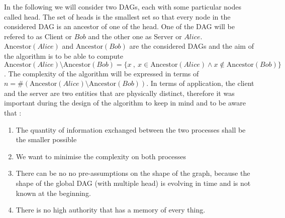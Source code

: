 In the following we will consider two DAGs, each with some particular nodes called head. The set of heads is the smallest set so that every node in the considered DAG is an ancestor of one of the head. One of the DAG will be refered to as Client or $Bob$ and the other one as Server or $Alice$. $\mathrm{Ancestor}(Alice)$ and $\mathrm{Ancestor}(Bob)$ are the considered DAGs and the aim of the algorithm is to be able to compute $\mathrm{Ancestor}(Alice) \setminus \mathrm{Ancestor}(Bob) = \{ x\ ,\ x \in \mathrm{Ancestor}(Alice) \wedge x \notin \mathrm{Ancestor}(Bob)\}$. The complexity of the algorithm will be expressed in terms of $n = \#(\mathrm{Ancestor}(Alice) \setminus \mathrm{Ancestor}(Bob))$. In terms of application, the client and the server are two entities that are physically distinct, therefore it was important during the design of the algorithm to keep in mind and to be aware that :
\begin{enumerate}
 \item The quantity of information exchanged between the two processes shall be the smaller possible
 \item We want to minimise the complexity on both processes
 \item There can be no no pre-assumptions on the shape of the graph, because the shape of the global DAG (with multiple head) is evolving in time and is not known at the beginning.
 \item There is no high authority that has a memory of every thing.
\end{enumerate}
